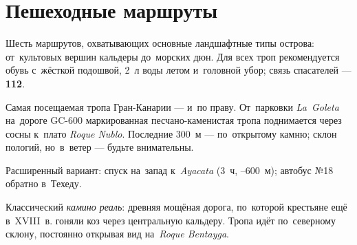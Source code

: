 \chapter{Пешеходные маршруты}

Шесть маршрутов, охватывающих основные ландшафтные типы острова:
от~культовых вершин кальдеры до~морских дюн. Для всех троп
рекомендуется обувь с~жёсткой подошвой, 2~л воды летом и~головной
убор; связь спасателей --- \textbf{112}.

\label{hike:gc1}


\noindent Самая посещаемая тропа Гран-Канарии --- и~по праву.
От~парковки \textit{La~Goleta} на~дороге GC-600 маркированная
песчано-каменистая тропа поднимается через сосны к~плато
\textit{Roque Nublo}. Последние 300~м --- по~открытому камню;
склон пологий, но~в~ветер --- будьте внимательны.




\begin{detour}
Расширенный вариант: спуск на~запад к~\textit{Ayacata} (3~ч, --600~м);
автобус №18 обратно в~Техеду.
\end{detour}



\noindent Классический \textit{камино реаль}: древняя мощёная
дорога, по~которой крестьяне ещё в~XVIII~в. гоняли коз через
центральную кальдеру. Тропа идёт по~северному склону,
постоянно открывая вид на~\textit{Roque Bentayga}.


